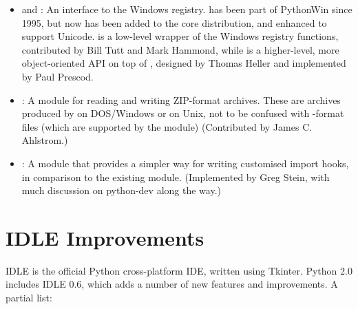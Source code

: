 \documentclass{howto}
\begin{document}
\begin{itemize}
\item{ and :} An interface to the
Windows registry.   has been part of PythonWin since
1995, but now has been added to the core distribution, and enhanced to
support Unicode.   is a low-level wrapper of the
Windows registry functions, contributed by Bill Tutt and Mark Hammond,
while  is a higher-level, more object-oriented API on top of 
, designed by Thomas Heller and implemented by Paul Prescod.

\item{:} A module for reading and writing ZIP-format
archives.  These are archives produced by  on
DOS/Windows or  on Unix, not to be confused with
-format files (which are supported by the 
module)
(Contributed by James C. Ahlstrom.)

\item{:} A module that provides a simpler way for
writing customised import hooks, in comparison to the existing
 module.  (Implemented by Greg Stein, with much
discussion on python-dev along the way.)

\end{itemize}

\section{IDLE Improvements}

IDLE is the official Python cross-platform IDE, written using Tkinter.
Python 2.0 includes IDLE 0.6, which adds a number of new features and
improvements.  A partial list:
\end{document}
